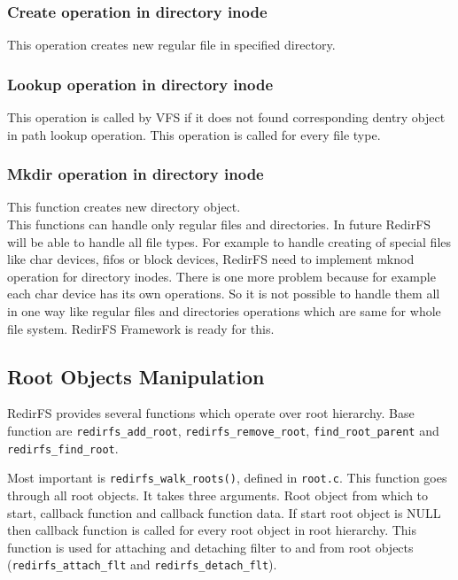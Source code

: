 \subsubsection{Create operation in directory inode}
This operation creates new regular file in specified directory.

\subsubsection{Lookup operation in directory inode}
This operation is called by VFS if it does not found corresponding dentry object in
path lookup operation. This operation is called for every file type.

\subsubsection{Mkdir operation in directory inode}
This function creates new directory object.\\

This functions can handle only regular files and directories. In future RedirFS will be
able to handle all file types. For example to handle creating of special files like
char devices, fifos or block devices, RedirFS need to implement mknod operation for
directory inodes. There is one more problem because for example each char device has
its own operations. So it is not possible to handle them all in one way like regular
files and directories operations which are same for whole file system. RedirFS
Framework is ready for this.

\subsection{Root Objects Manipulation}
RedirFS provides several functions which operate over root hierarchy. Base function
are \texttt{redirfs\_add\_root{}}, \texttt{redirfs\_remove\_root},
\texttt{find\_root\_parent} and \texttt{redirfs\_find\_root}. 

Most important is \texttt{redirfs\_walk\_roots()}, defined in \texttt{root.c}. This
function goes through all root objects. It takes three arguments. Root object from
which to start, callback function and callback function data. If start root object is
NULL then callback function is called for every root object in root hierarchy. This
function is used for attaching and detaching filter to and from root objects
(\texttt{redirfs\_attach\_flt} and \texttt{redirfs\_detach\_flt}). 

